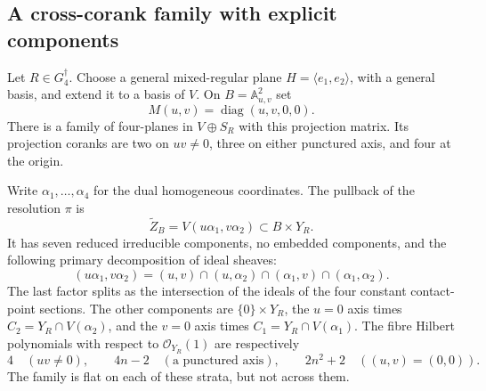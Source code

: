 \subsection{A cross-corank family with explicit components}

\begin{theorem}
\label{thm:cross-corank-incidence}
Let \(R\in G_4^\dagger\).  Choose a general mixed-regular plane
\(H=\langle e_1,e_2\rangle\), with a general basis, and extend it
to a basis of \(V\).  On \(B=\mathbb A^2_{u,v}\) set
\[
 M(u,v)=\operatorname{diag}(u,v,0,0).
\]
There is a family of four-planes in \(V\oplus S_R\) with this
projection matrix.  Its projection coranks are two on \(uv\ne0\),
three on either punctured axis, and four at the origin.

Write \(\alpha_1,\ldots,\alpha_4\) for the dual homogeneous
coordinates.  The pullback of the resolution \(\pi\) is
\[
 \widetilde Z_B=V(u\alpha_1,v\alpha_2)\subset B\times Y_R.
\]
It has seven reduced irreducible components, no embedded components,
and the following primary decomposition of ideal sheaves:
\begin{equation}\label{eq:cross-corank-primary}
 (u\alpha_1,v\alpha_2)
 =(u,v)\cap(u,\alpha_2)\cap(\alpha_1,v)
       \cap(\alpha_1,\alpha_2).
\end{equation}
The last factor splits as the intersection of the ideals of the four
constant contact-point sections.  The other components are
\(\{0\}\times Y_R\), the \(u=0\) axis times
\(C_2=Y_R\cap V(\alpha_2)\), and the \(v=0\) axis times
\(C_1=Y_R\cap V(\alpha_1)\).  The fibre Hilbert polynomials with
respect to \(\mathcal O_{Y_R}(1)\) are respectively
\[
 4\quad(uv\ne0),\qquad
 4n-2\quad(\text{a punctured axis}),\qquad
 2n^2+2\quad((u,v)=(0,0)).
\]
The family is flat on each of these strata, but not across them.
\end{theorem}
